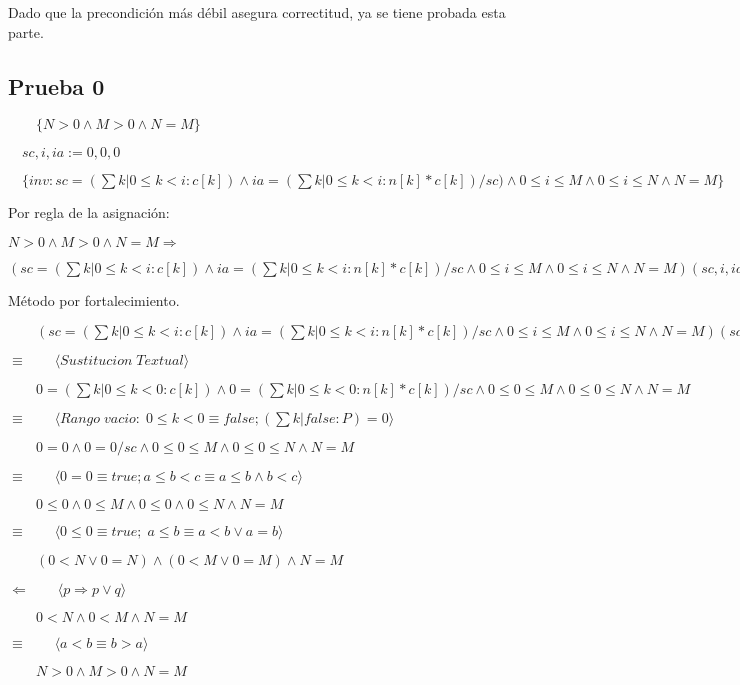 \documentclass[hidelinks]{article}
\begin{document}
Dado que la precondición más débil asegura correctitud, ya se tiene probada
esta parte.

\newpage

\subsection*{Prueba 0}
$\qquad \{N>0 \land M>0 \land N=M \}$\par
$\quad sc, i, ia := 0,0,0$\par
$\quad \{inv: sc=(\sum k|0 \leq k < i: c[k]) \land ia=(\sum k|0 \leq k < i: n[k]*c[k])/sc)\land 0 \leq i \leq M \land 0 \leq i \leq N \land N=M \}$

Por regla de la asignación:

$N>0 \land M>0 \land N=M \Rightarrow$\par
$(sc=(\sum k|0 \leq k < i: c[k]) \land ia=(\sum k|0 \leq k < i: n[k]*c[k])/sc\land 0 \leq i \leq M \land 0 \leq i \leq N \land N=M)(sc, i, ia := 0,0,0)$

Método por fortalecimiento.\par

$\qquad (sc=(\sum k|0 \leq k < i: c[k]) \land ia=(\sum k|0 \leq k < i: n[k]*c[k])/sc\land 0 \leq i \leq M \land 0 \leq i \leq N \land N=M)(sc, i, ia := 0,0,0)$\par
$\equiv  \qquad \langle Sustitucion \; Textual \rangle$\par
$\qquad 0=(\sum k|0 \leq k < 0: c[k]) \land 0=(\sum k|0 \leq k < 0: n[k]*c[k])/sc\land 0 \leq 0 \leq M \land 0 \leq 0 \leq N \land N=M$\par
$\equiv  \qquad \langle Rango \; vacio: \; 0 \leq k < 0 \equiv false; (\sum k|false: P) = 0 \rangle$\par
$\qquad 0=0 \land 0=0/sc\land 0 \leq 0 \leq M \land 0 \leq 0 \leq N \land N=M$\par
$\equiv  \qquad \langle 0=0 \equiv true; a \leq b < c \equiv a \leq b \land b < c \rangle$\par
$\qquad 0 \leq 0 \land 0 \leq M \land 0 \leq 0 \land 0 \leq N \land N=M$\par
$\equiv  \qquad \langle 0 \leq 0 \equiv true; \;  a \leq b \equiv a < b \lor a = b \rangle$\par
$\qquad (0 < N \lor 0 = N) \land (0 < M \lor 0 = M) \land N=M $\par
$\Leftarrow  \qquad \langle p \Rightarrow p \lor q \rangle$\par
$\qquad 0 < N \land 0 < M \land N=M $\par
$\equiv  \qquad \langle a<b \equiv b>a \rangle$\par
$\qquad N>0 \land M>0 \land N=M $\par
\end{document}
